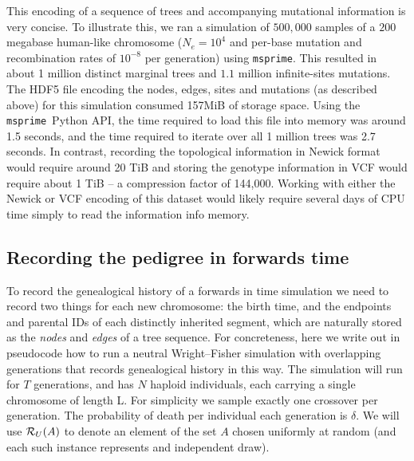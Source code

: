 \documentclass{article}
\newcommand{\msprime}{\texttt{msprime}}
\begin{document}
This encoding of a sequence of trees and accompanying mutational information is
very concise. To illustrate this, we ran a simulation of $500,000$ samples of a
$200$ megabase human-like chromosome ($N_e=10^4$ and per-base mutation and
recombination rates of $10^{-8}$ per generation) using \msprime. This resulted
in about 1 million distinct marginal trees and $1.1$ million infinite-sites
mutations. The HDF5 file encoding the nodes, edges, sites and mutations (as
described above) for this simulation consumed 157MiB of storage space. Using
the \msprime\ Python API, the time required to load this file into memory was
around 1.5 seconds, and the time required to iterate over all 1 million trees
was 2.7 seconds. In contrast, recording the topological information in Newick
format would require around 20 TiB and storing the genotype information
in VCF would require about 1 TiB --
a compression factor of 144,000.
Working with either the Newick or VCF encoding
of this dataset would likely require several
days of CPU time simply to read the information info memory.


\subsection*{Recording the pedigree in forwards time}

To record the genealogical history of a forwards in time simulation
we need to record two things for each new chromosome:
the birth time, and the endpoints and parental IDs of each distinctly inherited segment,
which are naturally stored as the \emph{nodes} and \emph{edges} of a tree sequence.
For concreteness, here we write out in pseudocode how to run a neutral Wright--Fisher simulation
with overlapping generations that records genealogical history in this way.
The simulation will run for $T$ generations,
and has $N$ haploid individuals, each carrying a single chromosome of length L.
For simplicity we sample exactly one crossover per generation.
The probability of death per individual each generation is $\delta$.
We will use
$\mathcal{R}_U(A)$ to denote an element of the set $A$ chosen uniformly at random 
(and each such instance represents and independent draw).
\end{document}
